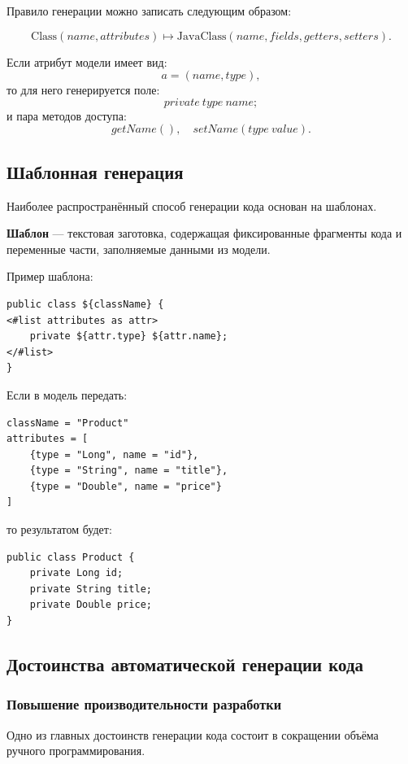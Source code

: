 \documentclass[12pt,a4paper]{article}
\begin{document}
Правило генерации можно записать следующим образом:

\[
    \text{Class}(name, attributes) \mapsto \text{JavaClass}(name, fields, getters, setters).
\]

Если атрибут модели имеет вид:
\[
    a = (name, type),
\]
то для него генерируется поле:
\[
    private\ type\ name;
\]
и пара методов доступа:
\[
    getName(), \quad setName(type\ value).
\]

\subsection{Шаблонная генерация}

Наиболее распространённый способ генерации кода основан на шаблонах.

\textbf{Шаблон} --- текстовая заготовка, содержащая фиксированные фрагменты кода и переменные части, заполняемые данными из модели.

Пример шаблона:

\begin{verbatim}
public class ${className} {
<#list attributes as attr>
    private ${attr.type} ${attr.name};
</#list>
}
\end{verbatim}

Если в модель передать:

\begin{verbatim}
className = "Product"
attributes = [
    {type = "Long", name = "id"},
    {type = "String", name = "title"},
    {type = "Double", name = "price"}
]
\end{verbatim}

то результатом будет:

\begin{verbatim}
public class Product {
    private Long id;
    private String title;
    private Double price;
}
\end{verbatim}

\subsection{Достоинства автоматической генерации кода}

\subsubsection{Повышение производительности разработки}

Одно из главных достоинств генерации кода состоит в сокращении объёма ручного программирования.
\end{document}
